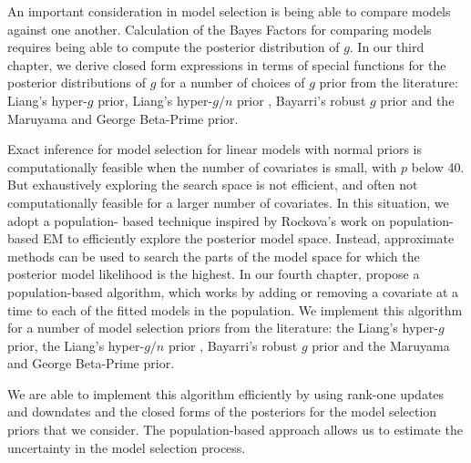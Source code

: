 An important consideration in model selection is being able to compare models against one another. Calculation
of the Bayes Factors for comparing models requires being able to compute the posterior distribution of $g$. In
our third chapter, we derive closed form expressions in terms of special functions for the posterior
distributions of $g$ for a number of choices of $g$ prior from the literature: Liang's hyper-$g$ prior,
Liang's hyper-$g/n$ prior \citep{Liang2008}, Bayarri's robust $g$ prior \citep{Bayarri2012} and the  Maruyama
and George Beta-Prime \citep{Maruyama2011} prior.

Exact inference for model selection for linear models with normal priors is computationally feasible when the
number of  covariates is small, with $p$ below 40. But exhaustively exploring the search space is not
efficient, and often not computationally feasible for a larger number of covariates. In this situation, we
adopt a population- based technique inspired by Rockova's work on population-based EM to efficiently explore
the posterior model space. Instead, approximate methods can be used to search the parts of the model space for
which the posterior model likelihood is the highest. In our fourth chapter, propose a population-based
algorithm, which works by adding or removing a covariate at a time to each of the fitted models in the
population. We implement this algorithm for a number of model selection priors from the literature: the
Liang's hyper-$g$ prior, the Liang's hyper-$g/n$ prior \citep{Liang2008}, Bayarri's robust $g$ prior
\citep{Bayarri2012} and the  Maruyama and George Beta-Prime \citep{Maruyama2011} prior.

We are able to implement this algorithm efficiently by using rank-one updates and downdates and the closed
forms of the posteriors for the model selection priors that we consider. The population-based approach allows
us to estimate the uncertainty in the model selection process.

